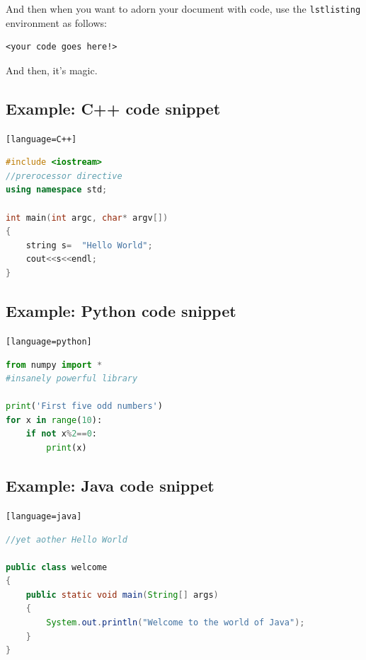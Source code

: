 \documentclass{article}
\theoremstyle{remark}
\begin{document}
And then when you want to adorn your document with code, use the \verb!lstlisting! environment as follows:
\begin{TeXlstlisting}
\begin{lstlisting}[language=<the programming language>]
<your code goes here!>
\end{lstlisting}
\end{TeXlstlisting}
And then, it's magic.

\clearpage

    \subsection{Example: C++ code snippet}
    \verb![language=C++]!
\begin{lstlisting}[language=C++]
#include <iostream>
//prerocessor directive
using namespace std;

int main(int argc, char* argv[])
{
    string s=  "Hello World";
    cout<<s<<endl;
}
\end{lstlisting}

    \subsection{Example: Python code snippet}
    \verb![language=python]!
\begin{lstlisting}[language=python]
from numpy import *
#insanely powerful library

print('First five odd numbers')
for x in range(10):
    if not x%2==0:
        print(x)
\end{lstlisting}

    \subsection{Example: Java code snippet}
    \verb![language=java]!
\begin{lstlisting}[language=java]
//yet aother Hello World

public class welcome
{
    public static void main(String[] args)
    {
        System.out.println("Welcome to the world of Java");
    }
}
\end{lstlisting}

\newpage


\end{document}
